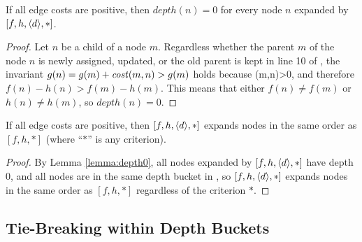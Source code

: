 

\begin{lemma}
  If all edge costs are positive, then
  $depth(n) = 0$ for every node $n$ expanded by \astar $[f,h,\depth,*]$.
  \label{lemma:depth0}
\end{lemma}
\begin{proof}
Let $n$ be a child of a node $m$.
Regardless whether the parent $m$ of the node $n$ is newly assigned, updated, or the old parent is kept in line 10 of ,
the invariant $g(n)=g(m)+\mit{cost}(m,n) > g(m)$ holds
because (m,n)>0,
and therefore $f(n)-h(n) > f(m)-h(m)$.
This means that either $f(n)\not=f(m)$ or $h(n)\not=h(m)$, so $depth(n) = 0$.
\end{proof}


\begin{theo}
  If all edge costs are positive, then \astar $[f,h,\depth,*]$ expands nodes in the same order as  \astar $[f,h,*]$ (where ``$*$'' is any criterion).
\end{theo}
\begin{proof}
  By Lemma \ref{lemma:depth0}, all nodes expanded by \astar $[f,h,\depth,*]$ have depth 0, and all nodes are in the same depth bucket in , so \astar $[f,h,\depth,*]$ expands nodes in the same order as \astar $[f,h,*]$ regardless of the criterion $*$.
\end{proof}


\subsection{Tie-Breaking within Depth Buckets}

